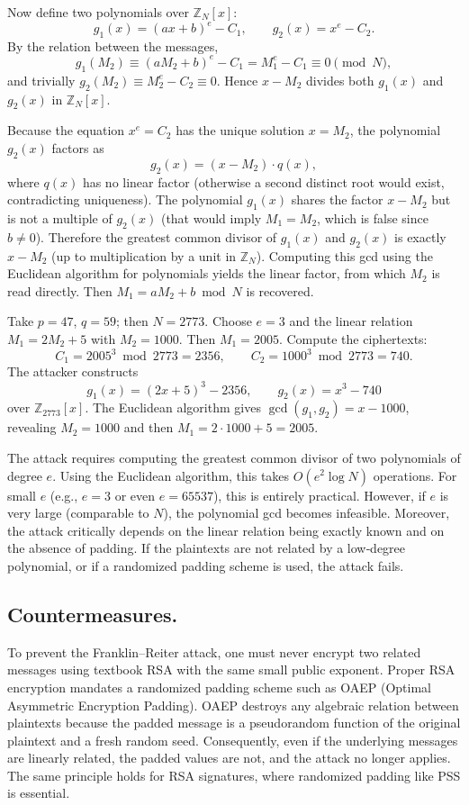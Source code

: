 Now define two polynomials over \(\mathbb{Z}_N[x]\):
\[
g_1(x) = (a x + b)^e - C_1,\qquad g_2(x) = x^e - C_2.
\]
By the relation between the messages,
\[
g_1(M_2) \equiv (a M_2 + b)^e - C_1 = M_1^e - C_1 \equiv 0 \pmod N,
\]
and trivially \(g_2(M_2) \equiv M_2^e - C_2 \equiv 0\). Hence \(x - M_2\) divides both \(g_1(x)\) and \(g_2(x)\) in \(\mathbb{Z}_N[x]\).

Because the equation \(x^e = C_2\) has the unique solution \(x = M_2\), the polynomial \(g_2(x)\) factors as
\[
g_2(x) = (x - M_2) \cdot q(x),
\]
where \(q(x)\) has no linear factor (otherwise a second distinct root would exist, contradicting uniqueness). The polynomial \(g_1(x)\) shares the factor \(x - M_2\) but is not a multiple of \(g_2(x)\) (that would imply \(M_1 = M_2\), which is false since \(b \neq 0\)). Therefore the greatest common divisor of \(g_1(x)\) and \(g_2(x)\) is exactly \(x - M_2\) (up to multiplication by a unit in \(\mathbb{Z}_N\)). Computing this gcd using the Euclidean algorithm for polynomials yields the linear factor, from which \(M_2\) is read directly. Then \(M_1 = a M_2 + b \bmod N\) is recovered.

Take \(p = 47\), \(q = 59\); then \(N = 2773\). Choose \(e = 3\) and the linear relation \(M_1 = 2M_2 + 5\) with \(M_2 = 1000\). Then \(M_1 = 2005\). Compute the ciphertexts:
\[
C_1 = 2005^3 \bmod 2773 = 2356,\qquad C_2 = 1000^3 \bmod 2773 = 740.
\]
The attacker constructs
\[
g_1(x) = (2x + 5)^3 - 2356,\qquad g_2(x) = x^3 - 740
\]
over \(\mathbb{Z}_{2773}[x]\). The Euclidean algorithm gives \(\gcd(g_1, g_2) = x - 1000\), revealing \(M_2 = 1000\) and then \(M_1 = 2 \cdot 1000 + 5 = 2005\).


The attack requires computing the greatest common divisor of two polynomials of degree \(e\). Using the Euclidean algorithm, this takes \(O(e^2 \log N)\) operations. For small \(e\) (e.g., \(e = 3\) or even \(e = 65537\)), this is entirely practical. However, if \(e\) is very large (comparable to \(N\)), the polynomial gcd becomes infeasible. Moreover, the attack critically depends on the linear relation being exactly known and on the absence of padding. If the plaintexts are not related by a low‑degree polynomial, or if a randomized padding scheme is used, the attack fails.

\subsection*{Countermeasures.}
To prevent the Franklin–Reiter attack, one must never encrypt two related messages using textbook RSA with the same small public exponent. Proper RSA encryption mandates a randomized padding scheme such as OAEP (Optimal Asymmetric Encryption Padding). OAEP destroys any algebraic relation between plaintexts because the padded message is a pseudorandom function of the original plaintext and a fresh random seed. Consequently, even if the underlying messages are linearly related, the padded values are not, and the attack no longer applies. The same principle holds for RSA signatures, where randomized padding like PSS is essential.
